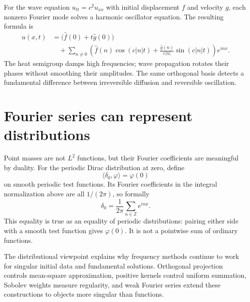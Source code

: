 For the wave equation \(u_{tt}=c^2u_{xx}\) with initial displacement \(f\) and velocity \(g\), each nonzero Fourier mode solves a harmonic oscillator equation. The resulting formula is
\[
\begin{aligned}
 u(x,t)
 &=\bigl(\widehat f(0)+t\widehat g(0)\bigr)\\
 &\quad+\sum_{n\ne0}
 \left(\widehat f(n)\cos(c|n|t)
 +\frac{\widehat g(n)}{c|n|}\sin(c|n|t)\right)e^{inx}.
\end{aligned}
\]
The heat semigroup damps high frequencies; wave propagation rotates their phases without smoothing their amplitudes. The same orthogonal basis detects a fundamental difference between irreversible diffusion and reversible oscillation.

\section{Fourier series can represent distributions}

Point masses are not \(L^2\) functions, but their Fourier coefficients are meaningful by duality. For the periodic Dirac distribution at zero, define
\[
 \langle\delta_0,\varphi\rangle=\varphi(0)
\]
on smooth periodic test functions. Its Fourier coefficients in the integral normalization above are all \(1/(2\pi)\), so formally
\[
 \boxed{\delta_0=\frac1{2\pi}
   \sum_{n\in\mathbb Z}e^{inx}.}
\]
This equality is true as an equality of periodic distributions: pairing either side with a smooth test function gives \(\varphi(0)\). It is not a pointwise sum of ordinary functions.

The distributional viewpoint explains why frequency methods continue to work for singular initial data and fundamental solutions. Orthogonal projection controls mean-square approximation, positive kernels control uniform summation, Sobolev weights measure regularity, and weak Fourier series extend these constructions to objects more singular than functions.
